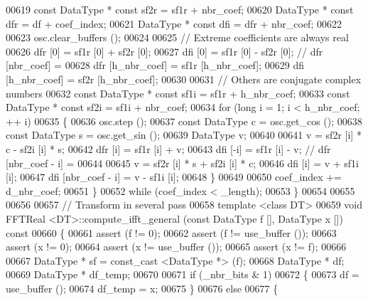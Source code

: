 \begin{DoxyCode}
00619         \textcolor{keyword}{const} DataType  * \textcolor{keyword}{const} sf2r = sf1r + nbr\_coef;
00620         DataType            * \textcolor{keyword}{const} dfr = df + coef\_index;
00621         DataType            * \textcolor{keyword}{const} dfi = dfr + nbr\_coef;
00622 
00623         osc.clear\_buffers ();
00624 
00625         \textcolor{comment}{// Extreme coefficients are always real}
00626         dfr [0] = sf1r [0] + sf2r [0];
00627         dfi [0] = sf1r [0] - sf2r [0];  \textcolor{comment}{// dfr [nbr\_coef] =}
00628         dfr [h\_nbr\_coef] = sf1r [h\_nbr\_coef];
00629         dfi [h\_nbr\_coef] = sf2r [h\_nbr\_coef];
00630 
00631         \textcolor{comment}{// Others are conjugate complex numbers}
00632         \textcolor{keyword}{const} DataType * \textcolor{keyword}{const}  sf1i = sf1r + h\_nbr\_coef;
00633         \textcolor{keyword}{const} DataType * \textcolor{keyword}{const}  sf2i = sf1i + nbr\_coef;
00634         \textcolor{keywordflow}{for} (\textcolor{keywordtype}{long} i = 1; i < h\_nbr\_coef; ++ i)
00635         \{
00636             osc.step ();
00637             \textcolor{keyword}{const} DataType  c = osc.get\_cos ();
00638             \textcolor{keyword}{const} DataType  s = osc.get\_sin ();
00639             DataType            v;
00640 
00641             v = sf2r [i] * c - sf2i [i] * s;
00642             dfr [i] = sf1r [i] + v;
00643             dfi [-i] = sf1r [i] - v;    \textcolor{comment}{// dfr [nbr\_coef - i] =}
00644 
00645             v = sf2r [i] * s + sf2i [i] * c;
00646             dfi [i] = v + sf1i [i];
00647             dfi [nbr\_coef - i] = v - sf1i [i];
00648         \}
00649 
00650         coef\_index += d\_nbr\_coef;
00651     \}
00652     \textcolor{keywordflow}{while} (coef\_index < \_length);
00653 \}
00654 
00655 
00656 
00657 \textcolor{comment}{// Transform in several pass}
00658 \textcolor{keyword}{template} <\textcolor{keyword}{class} DT>
00659 \textcolor{keywordtype}{void}    FFTReal <DT>::compute\_ifft\_general (\textcolor{keyword}{const} DataType f [], DataType x []) \textcolor{keyword}{const}
00660 \{
00661     assert (f != 0);
00662     assert (f != use\_buffer ());
00663     assert (x != 0);
00664     assert (x != use\_buffer ());
00665     assert (x != f);
00666 
00667     DataType *      sf = const\_cast <DataType *> (f);
00668     DataType *      df;
00669     DataType *      df\_temp;
00670 
00671     \textcolor{keywordflow}{if} (\_nbr\_bits & 1)
00672     \{
00673         df = use\_buffer ();
00674         df\_temp = x;
00675     \}
00676     \textcolor{keywordflow}{else}
00677     \{

\end{DoxyCode}
